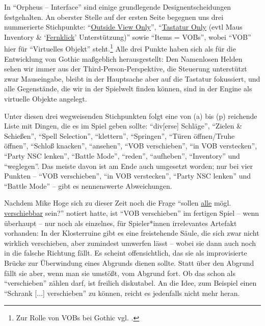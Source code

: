 \documentclass[12pt]{scrbook}
\begin{document}
In \enquote{Orpheus -- Interface} sind einige grundlegende Designentscheidungen festgehalten.
An oberster Stelle auf der ersten Seite begegnen uns drei nummerierte Stichpunkte:
\enquote{\uline{Outside View Only}}, \enquote{\uline{Tastatur Only} (evtl Maus Inventory \& \enquote{\uline{Fernklick}} Unterstützung)} sowie \enquote{Items = VOBs},\autocite[S.~1]{orpheus_interface} wobei \enquote{VOB} hier für \enquote{Virtuelles Objekt} steht.\footnote{Zur Rolle von VOBs bei Gothic vgl. \autocite{wiki_vob}.}
Alle drei Punkte haben sich als für die Entwicklung von Gothic maßgeblich herausgestellt:
Den Namenlosen Helden sehen wir immer aus der Third-Person-Perspektive, die Steuerung unterstützt zwar Mauseingabe, bleibt in der Hauptsache aber auf die Tastatur fokussiert, und alle Gegenstände, die wir in der Spielwelt finden können, sind in der Engine als virtuelle Objekte angelegt.

Unter diesen drei wegweisenden Stichpunkten folgt eine von (a) bis (p) reichende Liste mit Dingen, die es im Spiel geben sollte:
\enquote{div[erse] Schläge}, \enquote{Zielen \& Schießen}, \enquote{Spell Selection}, \enquote{klettern}, \enquote{Springen}, \enquote{Türen öffnen/Truhe öffnen}, \enquote{Schloß knacken}, \enquote{ansehen}, \enquote{VOB verschieben}, \enquote{in VOB verstecken}, \enquote{Party NSC lenken}, \enquote{Battle Mode}, \enquote{reden}, \enquote{aufheben}, \enquote{Inventory} und \enquote{weglegen}.\autocite[S.~1]{orpheus_interface}
Das meiste davon ist am Ende auch umgesetzt worden; nur bei vier Punkten -- \enquote{VOB verschieben}, \enquote{in VOB verstecken}, \enquote{Party NSC lenken} und \enquote{Battle Mode} -- gibt es nennenswerte Abweichungen.

Nachdem Mike Hoge sich zu dieser Zeit noch die Frage \enquote{sollen \uline{alle} mögl. \uline{verschiebbar} sein?}\autocite[S.~3]{orpheus_interface} notiert hatte, ist \enquote{VOB verschieben} im fertigen Spiel -- wenn überhaupt -- nur noch als einzelnes, für Spieler*innen irrelevantes Artefakt vorhanden:
In der Klosterruine gibt es eine freistehende Säule, die sich zwar nicht wirklich verschieben, aber zumindest umwerfen lässt -- wobei sie dann auch noch in die falsche Richtung fällt.
Es scheint offensichtlich, das sie als improvisierte Brücke zur Überwindung eines Abgrunds dienen sollte.
Statt über den Abgrund fällt sie aber, wenn man sie umstößt, vom Abgrund fort.
Ob das schon als \enquote{verschieben} zählen darf, ist freilich diskutabel.
An die Idee, zum Beispiel einen \enquote{Schrank [$\ldots$] verschieben}\autocite[S.~3]{orpheus_interface} zu können, reicht es jedenfalls nicht mehr heran.
\end{document}
